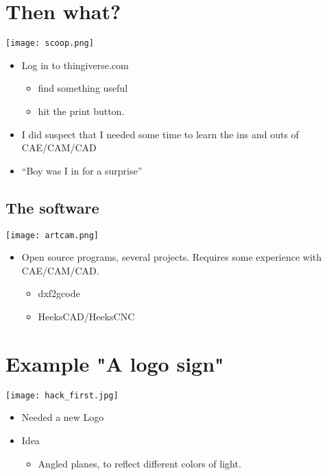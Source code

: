 \documentclass[11pt]{beamer}
\begin{document}
\section{Then what?}
\label{sec-4}

\texttt{[image: scoop.png]}
\begin{itemize}
\item Log in to thingiverse.com

\begin{itemize}
\item find something useful
\item hit the print button.
\end{itemize}

\item I did suspect that I needed some time to learn the ins and outs of CAE/CAM/CAD
\item ``Boy was I in for  a surprise''
\end{itemize}
\subsection*{The software}\begin{frame}[fragile]
\label{sec-4.1}

\texttt{[image: artcam.png]}
\begin{itemize}
\item Open source programs, several projects. Requires some experience
     with CAE/CAM/CAD.

\begin{itemize}
\item dxf2gcode
\item HeeksCAD/HeeksCNC
\end{itemize}

\end{itemize}
\end{frame}
\section{Example "A logo sign"}
\label{sec-5}

\texttt{[image: hack\_first.jpg]}
\begin{itemize}
\item Needed a new Logo
\item Idea

\begin{itemize}
\item Angled planes, to reflect different colors of light.
\end{itemize}

\end{itemize}
\end{document}

